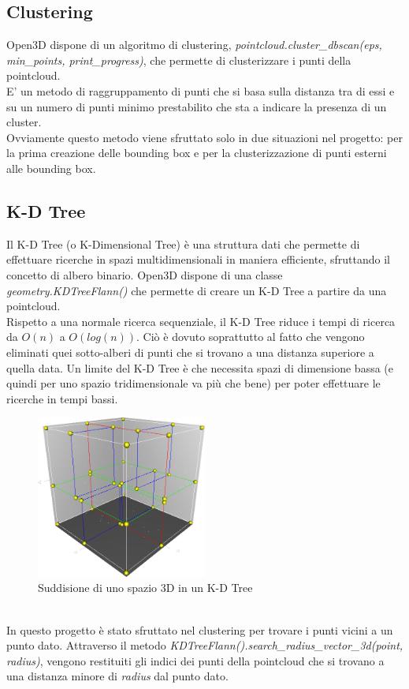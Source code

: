 \documentclass[italian]{report}
\begin{document}
\subsection{Clustering}
Open3D dispone di un algoritmo di clustering, \textit{pointcloud.cluster\_dbscan(eps, min\_points, print\_progress)}, che permette di clusterizzare i punti della pointcloud.\\
E' un metodo di raggruppamento di punti che si basa sulla distanza tra di essi e su un numero di punti minimo prestabilito che sta a indicare la presenza di un cluster.\\
Ovviamente questo metodo viene sfruttato solo in due situazioni nel progetto: per la prima creazione delle bounding box e per la clusterizzazione di punti esterni alle bounding box.
\subsection{K-D Tree}
Il K-D Tree (o K-Dimensional Tree) è una struttura dati che permette di effettuare ricerche in spazi multidimensionali in maniera efficiente, sfruttando il concetto di albero binario. Open3D dispone di una classe \textit{geometry.KDTreeFlann()} che permette di creare un K-D Tree a partire da una pointcloud.\\
Rispetto a una normale ricerca sequenziale, il K-D Tree riduce i tempi di ricerca da $O(n)$ a $O(log(n))$. Ciò è dovuto soprattutto al fatto che vengono eliminati quei sotto-alberi di punti che si trovano a una distanza superiore a quella data. Un limite del K-D Tree è che necessita spazi di dimensione bassa (e quindi per uno spazio tridimensionale va più che bene) per poter effettuare le ricerche in tempi bassi.
\begin{figure}[H]
	\centering
	\includegraphics[width=0.5\textwidth]{3dtree}
	\footnotesize
	\caption{Suddisione di uno spazio 3D in un K-D Tree}
\end{figure}\\
In questo progetto è stato sfruttato nel clustering per trovare i punti vicini a un punto dato. Attraverso il metodo \textit{KDTreeFlann().search\_radius\_vector\_3d(point, radius)}, vengono restituiti gli indici dei punti della pointcloud che si trovano a una distanza minore di \textit{radius} dal punto dato.
\end{document}
